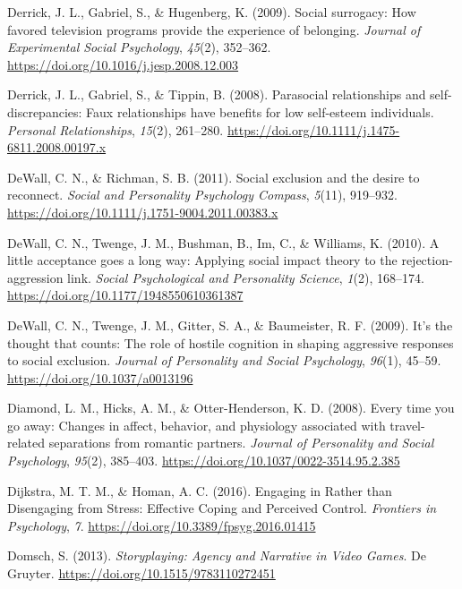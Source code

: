 \documentclass[
]{udthesis}
\newlength{\cslhangindent}
\newenvironment{CSLReferences}[2] %
 {\begin{list}{}{%
  \setlength{\itemindent}{0pt}
  \setlength{\leftmargin}{0pt}
  \setlength{\parsep}{0pt}
  \ifodd #1
   \setlength{\leftmargin}{\cslhangindent}
   \setlength{\itemindent}{-1\cslhangindent}
  \fi
  \setlength{\itemsep}{#2\baselineskip}}}
 {\end{list}}
\begin{document}
\begin{CSLReferences}{1}{0}
Derrick, J. L., Gabriel, S., \& Hugenberg, K. (2009). Social surrogacy: {How} favored television programs provide the experience of belonging. \emph{Journal of Experimental Social Psychology}, \emph{45}(2), 352--362. \url{https://doi.org/10.1016/j.jesp.2008.12.003}

Derrick, J. L., Gabriel, S., \& Tippin, B. (2008). Parasocial relationships and self-discrepancies: Faux relationships have benefits for low self-esteem individuals. \emph{Personal Relationships}, \emph{15}(2), 261--280. \url{https://doi.org/10.1111/j.1475-6811.2008.00197.x}

DeWall, C. N., \& Richman, S. B. (2011). Social exclusion and the desire to reconnect. \emph{Social and Personality Psychology Compass}, \emph{5}(11), 919--932. \url{https://doi.org/10.1111/j.1751-9004.2011.00383.x}

DeWall, C. N., Twenge, J. M., Bushman, B., Im, C., \& Williams, K. (2010). A little acceptance goes a long way: {Applying} social impact theory to the rejection-aggression link. \emph{Social Psychological and Personality Science}, \emph{1}(2), 168--174. \url{https://doi.org/10.1177/1948550610361387}

DeWall, C. N., Twenge, J. M., Gitter, S. A., \& Baumeister, R. F. (2009). It's the thought that counts: The role of hostile cognition in shaping aggressive responses to social exclusion. \emph{Journal of Personality and Social Psychology}, \emph{96}(1), 45--59. \url{https://doi.org/10.1037/a0013196}

Diamond, L. M., Hicks, A. M., \& Otter-Henderson, K. D. (2008). Every time you go away: {Changes} in affect, behavior, and physiology associated with travel-related separations from romantic partners. \emph{Journal of Personality and Social Psychology}, \emph{95}(2), 385--403. \url{https://doi.org/10.1037/0022-3514.95.2.385}

Dijkstra, M. T. M., \& Homan, A. C. (2016). Engaging in {Rather} than {Disengaging} from {Stress}: {Effective Coping} and {Perceived Control}. \emph{Frontiers in Psychology}, \emph{7}. \url{https://doi.org/10.3389/fpsyg.2016.01415}

Domsch, S. (2013). \emph{Storyplaying: {Agency} and {Narrative} in {Video Games}}. {De Gruyter}. \url{https://doi.org/10.1515/9783110272451}


\end{CSLReferences}
\end{document}
